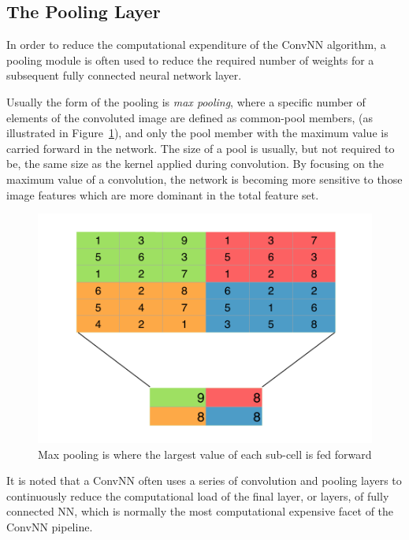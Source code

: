 \documentclass[letterpaper,12pt]{article}
\newcommand{\figref}[1]{Figure~\ref{#1}}
\begin{document}
\subsection{The Pooling Layer}

In order to reduce the computational expenditure of the ConvNN algorithm, a pooling module is often used to reduce the required number of weights for a subsequent fully connected neural network layer.  

Usually the form of the pooling is \textit{max pooling}, where  a specific number of elements of the convoluted image are defined as common-pool members, (as illustrated in \figref{maxPool}), and only the pool member with the maximum value is carried forward in the network. The size of a pool is usually, but not required to be, the same size as the kernel applied during convolution. By focusing on the maximum value of a convolution, the network is becoming more sensitive to those image features which are more dominant in the total feature set.

\begin{figure}[htbp]
\begin{center}
\includegraphics[scale=0.6]{images/maxpool.png}
\caption{Max pooling is where the largest value of each sub-cell is fed forward}
\label{maxPool}
\end{center}
\end{figure}

It is noted that a ConvNN often uses a series of convolution and pooling layers to continuously reduce the computational load of the final layer, or layers, of fully connected NN, which is normally the most computational expensive facet of the ConvNN pipeline. 
\end{document}
